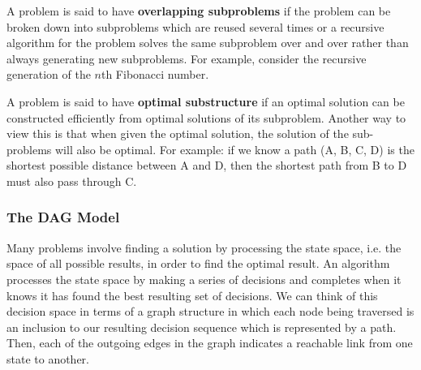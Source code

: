 \documentclass{article}
\begin{document}
        
        
        
    
    A problem is said to have \textbf{overlapping subproblems} if the problem can be broken down into subproblems which are reused several times or a recursive algorithm for the problem solves the same subproblem over and over rather than always generating new subproblems. For example, consider the recursive generation of the $n$th Fibonacci number.
    
    A problem is said to have \textbf{optimal substructure} if an optimal solution can be constructed efficiently from optimal solutions of its subproblem. Another way to view this is that when given the optimal solution, the solution of the sub-problems will also be optimal. For example: if we know a path (A, B, C, D) is the shortest possible distance between A and D, then the shortest path from B to D must also pass through C.
    
   \subsubsection{The DAG Model}
    Many problems involve finding a solution by processing the state space, i.e. the space of all possible results, in order to find the optimal result. An algorithm processes the state space by making a series of decisions and completes when it knows it has found the best resulting set of decisions. We can think of this decision space in terms of a graph structure in which each node being traversed is an inclusion to our resulting decision sequence which is represented by a path. Then, each of the outgoing edges in the graph indicates a reachable link from one state to another. 
    
\end{document}
